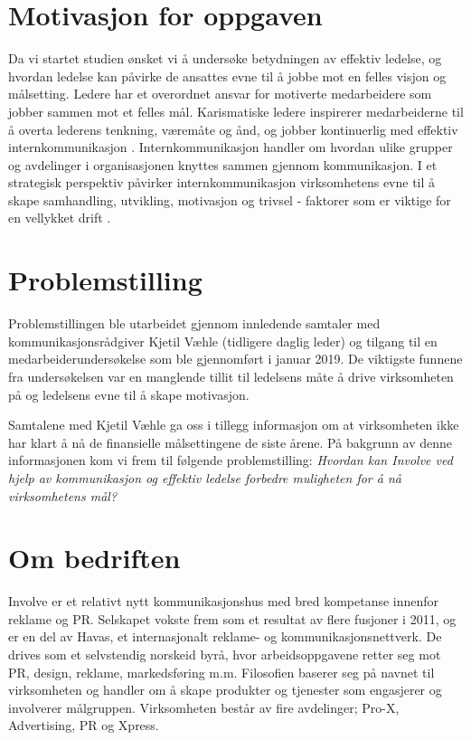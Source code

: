 \section{Motivasjon for oppgaven}
Da vi startet studien ønsket vi å undersøke betydningen av effektiv ledelse, og hvordan ledelse kan påvirke de ansattes evne til å jobbe mot en felles visjon og målsetting. Ledere har et overordnet ansvar for motiverte medarbeidere som jobber sammen mot et felles mål. Karismatiske ledere inspirerer medarbeiderne til å overta lederens tenkning, væremåte og ånd, og jobber kontinuerlig med effektiv internkommunikasjon \cite[s.~137]{KommunikasjonForLedere}. Internkommunikasjon handler om hvordan ulike grupper og avdelinger i organisasjonen knyttes sammen gjennom kommunikasjon. I et strategisk perspektiv påvirker internkommunikasjon virksomhetens evne til å skape samhandling, utvikling, motivasjon og trivsel - faktorer som er viktige for en vellykket drift \cite{estudie}.

\section{Problemstilling}
Problemstillingen ble utarbeidet gjennom innledende samtaler med kommunikasjonsrådgiver Kjetil Væhle (tidligere daglig leder) og tilgang til en medarbeiderundersøkelse som ble gjennomført i januar 2019. De viktigste funnene fra undersøkelsen var en manglende tillit til ledelsens måte å drive virksomheten på og ledelsens evne til å skape motivasjon. 

\indent \newline
Samtalene med Kjetil Væhle ga oss i tillegg informasjon om at virksomheten ikke har klart å nå de finansielle målsettingene de siste årene. På bakgrunn av denne informasjonen kom vi frem til følgende problemstilling:
\textit{Hvordan kan Involve ved hjelp av kommunikasjon og effektiv ledelse forbedre muligheten for å nå virksomhetens mål?}

\section{Om bedriften}
Involve er et relativt nytt kommunikasjonshus med bred kompetanse innenfor reklame og PR. Selskapet vokste frem som et resultat av flere fusjoner i 2011, og er en del av Havas, et internasjonalt reklame- og kommunikasjonsnettverk. De drives som et selvstendig norskeid byrå, hvor arbeidsoppgavene retter seg mot PR, design, reklame, markedsføring m.m. Filosofien baserer seg på navnet til virksomheten og handler om å skape produkter og tjenester som engasjerer og involverer målgruppen. Virksomheten består av fire avdelinger; Pro-X, Advertising, PR og Xpress.


